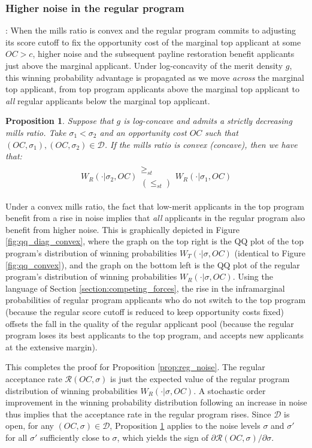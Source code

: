 \documentclass[12pt,reqno]{amsart}
\newtheorem{proposition}{Proposition}
\theoremstyle{definition}
\theoremstyle{plain} %
\begin{document}
\subsubsection{Higher noise in the regular program}: When the mills ratio is convex and the regular program commits to adjusting its score cutoff to fix the opportunity cost of the marginal top applicant at some $OC>c$, higher noise and the subsequent payline restoration benefit applicants just above the marginal applicant. Under log-concavity of the merit density $g$, this winning probability advantage is propagated as we move \textit{across} the marginal top applicant, from top program applicants above the marginal top applicant to \textit{all} regular applicants below the marginal top applicant. 
\begin{proposition}\label{prop:regwin_likelihood}
Suppose that $g$ is log-concave and admits a strictly decreasing mills ratio. Take $\sigma_1<\sigma_2$ and an opportunity cost $OC$ such that $(OC,\sigma_1),(OC,\sigma_2)\in\mathcal{D}$. If the mills ratio is convex (concave), then we have that:
\begin{align*}
    W_R(\cdot|\sigma_2,OC) \substack{\geq_{st}\\ (\leq_{st})}  W_R(\cdot|\sigma_1,OC) 
\end{align*}
\end{proposition}
\noindent Under a convex mills ratio, the fact that low-merit applicants in the top program benefit from a rise in noise implies that \textit{all} applicants in the regular program also benefit from higher noise. This is graphically depicted in Figure \ref{fig:qq_diag_convex}, where the graph on the top right is the QQ plot of the top program's distribution of winning probabilities $W_T(\cdot|\sigma,OC)$ (identical to Figure \ref{fig:qq_convex}), and the graph on the bottom left is the QQ plot of the regular program's distribution of winning probabilities $W_R(\cdot|\sigma,OC)$. Using the language of Section \ref{section:competing_forces}, the rise in the inframarginal probabilities of regular program applicants who do not switch to the top program (because the regular score cutoff is reduced to keep opportunity costs fixed) offsets the fall in the quality of the regular applicant pool (because the regular program loses its best applicants to the top program, and accepts new applicants at the extensive margin). 

\noindent This completes the proof for Proposition \ref{prop:reg_noise}. The regular acceptance rate $\mathcal{R}(OC,\sigma)$ is just the expected value of the regular program distribution of winning probabilities $W_R(\cdot|\sigma,OC)$. A stochastic order improvement in the winning probability distribution following an increase in noise thus implies that the acceptance rate in the regular program rises. Since $\mathcal{D}$ is open, for any $(OC,\sigma)\in\mathcal{D}$, Proposition \ref{prop:regwin_likelihood} applies to the noise levels $\sigma$ and $\sigma'$ for all $\sigma'$ sufficiently close to $\sigma$, which yields the sign of $\partial\mathcal{R}(OC,\sigma)/\partial\sigma$.
\end{document}
